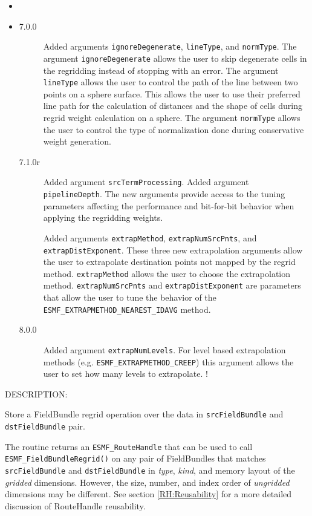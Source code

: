    \begin{itemize}
   \item{}
   \item{}
   \begin{description}
   \item[7.0.0] Added arguments {\tt ignoreDegenerate}, {\tt lineType},
   and {\tt normType}. The argument {\tt ignoreDegenerate} allows the user to skip degenerate
   cells in the regridding instead of stopping with an error.
   The argument {\tt lineType} allows the user to
   control the path of the line between two points on a sphere surface.
   This allows the user to use their preferred line path for the calculation
   of distances and the shape of cells during regrid weight calculation on
   a sphere. The argument {\tt normType} allows the user to
   control the type of normalization done during conservative weight generation.
   \item[7.1.0r] Added argument {\tt srcTermProcessing}.
   Added argument {\tt pipelineDepth}.
   The new arguments provide access to the tuning parameters
   affecting the performance and bit-for-bit behavior when applying
   the regridding weights.
  
   Added arguments {\tt extrapMethod}, {\tt extrapNumSrcPnts}, and
   {\tt extrapDistExponent}. These three new extrapolation arguments allow the
   user to extrapolate destination points not mapped by the regrid method.
   {\tt extrapMethod} allows the user to choose the extrapolation method.
   {\tt extrapNumSrcPnts} and {\tt extrapDistExponent} are parameters that
   allow the user to tune the behavior of the {\tt ESMF\_EXTRAPMETHOD\_NEAREST\_IDAVG}
   method.
   \item[8.0.0] Added argument {\tt extrapNumLevels}. For level based extrapolation methods
   (e.g. {\tt ESMF\_EXTRAPMETHOD\_CREEP}) this argument allows the user to
   set how many levels to extrapolate.
  !
   \end{description}
   \end{itemize}
  
{\sf DESCRIPTION:\\ }


   Store a FieldBundle regrid operation over the data in {\tt srcFieldBundle} and
   {\tt dstFieldBundle} pair.
  
   The routine returns an {\tt ESMF\_RouteHandle} that can be used to call
   {\tt ESMF\_FieldBundleRegrid()} on any pair of FieldBundles that matches
   {\tt srcFieldBundle} and {\tt dstFieldBundle} in {\em type}, {\em kind},
   and memory layout of the {\em gridded} dimensions. However, the size,
   number, and index order of {\em ungridded} dimensions may be different.
   See section \ref{RH:Reusability} for a more detailed discussion of
   RouteHandle reusability.
  
